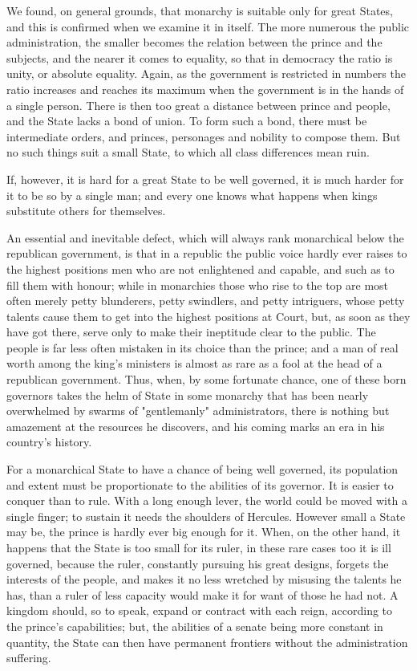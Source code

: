\documentclass[12pt]{report}
\begin{document}
We found, on general grounds, that monarchy is suitable only for great States, and this is confirmed when we examine it in itself. The more numerous the public administration, the smaller becomes the relation between the prince and the subjects, and the nearer it comes to equality, so that in democracy the ratio is unity, or absolute equality. Again, as the government is restricted in numbers the ratio increases and reaches its maximum when the government is in the hands of a single person. There is then too great a distance between prince and people, and the State lacks a bond of union. To form such a bond, there must be intermediate orders, and princes, personages and nobility to compose them. But no such things suit a small State, to which all class differences mean ruin.

If, however, it is hard for a great State to be well governed, it is much harder for it to be so by a single man; and every one knows what happens when kings substitute others for themselves.

An essential and inevitable defect, which will always rank monarchical below the republican government, is that in a republic the public voice hardly ever raises to the highest positions men who are not enlightened and capable, and such as to fill them with honour; while in monarchies those who rise to the top are most often merely petty blunderers, petty swindlers, and petty intriguers, whose petty talents cause them to get into the highest positions at Court, but, as soon as they have got there, serve only to make their ineptitude clear to the public. The people is far less often mistaken in its choice than the prince; and a man of real worth among the king's ministers is almost as rare as a fool at the head of a republican government. Thus, when, by some fortunate chance, one of these born governors takes the helm of State in some monarchy that has been nearly overwhelmed by swarms of "gentlemanly" administrators, there is nothing but amazement at the resources he discovers, and his coming marks an era in his country's history.

For a monarchical State to have a chance of being well governed, its population and extent must be proportionate to the abilities of its governor. It is easier to conquer than to rule. With a long enough lever, the world could be moved with a single finger; to sustain it needs the shoulders of Hercules. However small a State may be, the prince is hardly ever big enough for it. When, on the other hand, it happens that the State is too small for its ruler, in these rare cases too it is ill governed, because the ruler, constantly pursuing his great designs, forgets the interests of the people, and makes it no less wretched by misusing the talents he has, than a ruler of less capacity would make it for want of those he had not. A kingdom should, so to speak, expand or contract with each reign, according to the prince's capabilities; but, the abilities of a senate being more constant in quantity, the State can then have permanent frontiers without the administration suffering.
\end{document}
